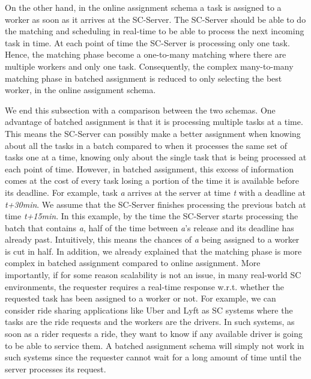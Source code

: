On the other hand, in the online assignment schema a task is assigned to a worker as soon as it arrives at the SC-Server. The SC-Server should be able to do the matching and scheduling in real-time to be able to process the next incoming task in time. At each point of time the SC-Server is processing only one task. Hence, the matching phase become a one-to-many matching where there are multiple workers and only one task. Consequently, the complex many-to-many matching phase in batched assignment is reduced to only selecting the best worker, in the online assignment schema.

We end this subsection with a comparison between the two schemas. One advantage of batched assignment is that it is processing multiple tasks at a time. This means the SC-Server can possibly make a better assignment when knowing about all the tasks in a batch compared to when it processes the same set of tasks one at a time, knowing only about the single task that is being processed at each point of time. However, in batched assignment, this excess of information comes at the cost of every task losing a portion of the time it is available before its deadline. For example, task \textit{a} arrives at the server at time \textit{t} with a deadline at \textit{t+30min}. We assume that the SC-Server finishes processing the previous batch at time \textit{t+15min}. In this example, by the time the SC-Server starts processing the batch that contains \textit{a}, half of the time between \textit{a}'s release and its deadline has already past. Intuitively, this means the chances of \textit{a} being assigned to a worker is cut in half. In addition, we already explained that the matching phase is more complex in batched assignment compared to online assignment. More importantly, if for some reason scalability is not an issue, in many real-world SC environments, the requester requires a real-time response w.r.t. whether the requested task has been assigned to a worker or not. For example, we can consider ride sharing applications like Uber and Lyft as SC systems where the tasks are the ride requests and the workers are the drivers. In such systems, as soon as a rider requests a ride, they want to know if any available driver is going to be able to service them. A batched assignment schema will simply not work in such systems since the requester cannot wait for a long amount of time until the server processes its request.

